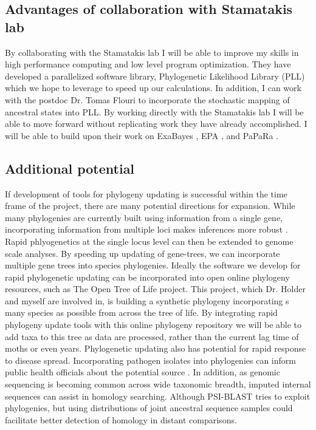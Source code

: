 \documentclass[10pt]{article}
\begin{document}
\subsection*{Advantages of collaboration with Stamatakis lab}

By collaborating with the Stamatakis lab I will be able to improve my skills in high performance computing and low level program optimization.
They have developed a parallelized software library, Phylogenetic Likelihood Library (PLL)  which we hope to leverage to speed up our calculations. 
In addition, I can work with the postdoc Dr. Tomas Flouri to incorporate the stochastic mapping of ancestral states into PLL.
By working directly with the Stamatakis lab I will be able to move forward without replicating work they have already accomplished.
I will be able to build upon their work on ExaBayes  \cite{Stamatakis_novel_2013} , EPA \cite{berger_performance_2011}, and PaPaRa  \cite{Berger_aligning_2011} .


\subsection*{Additional potential}
If development of tools for phylogeny updating is successful within the time frame of the project, there are many potential directions for expansion. 
While many phylogenies are currently built using information from a single gene, incorporating information from multiple loci makes inferences more robust \cite{edwards_looking_2009}. 
Rapid phlyogenetics at the single locus level can then be extended to genome scale analyses.
By speeding up updating of gene-trees, we can incorporate multiple gene trees into species phylogenies.
Ideally the software we develop for rapid phylogenetic updating can be incorporated into open online phylogeny resources, such as The Open Tree of Life project. 
This project, which Dr. 
Holder and myself are involved in, is building a synthetic phylogeny incorporating s many species as possible from across the tree of life. 
By integrating rapid phylogeny update tools with this online phylogeny repository we will be able to add taxa to this tree as data are processed, rather than the current lag time of moths or even years. 
Phylogenetic updating also has potential for rapid response to disease spread. 
Incorporating pathogen isolates into phylogenies can inform public health officials about the potential source \cite{timme_phylogenetic_2013}.
In addition, as genomic sequencing is becoming common across wide taxonomic breadth, imputed internal sequences can assist in homology searching.
Although PSI-BLAST \cite{altschul_gapped_1997} tries to exploit phylogenies, but using distributions of joint ancestral sequence samples could facilitate better detection of homology in distant comparisons.
\end{document}
